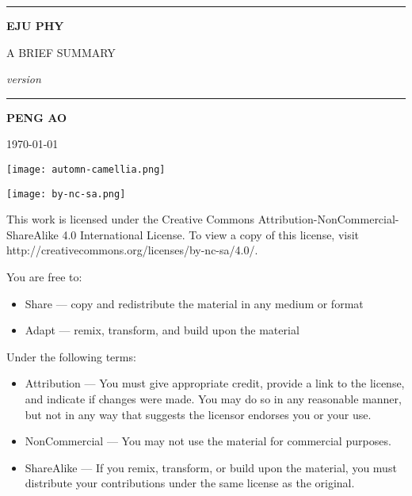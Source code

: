 
\begin{titlepage}
    \begin{center}
        \vspace{4cm}
        
        \rule{\textwidth}{1.2pt}
        
        \vspace{0.3cm}

        {\Huge \textbf{EJU PHY}}

        \vspace{0.3cm}

        {\LARGE A BRIEF SUMMARY}

        \vspace{0.3cm}

        {\Large \textit{version \version}}

        \rule{\textwidth}{1.2pt}

        \vspace{2cm}

        {\LARGE \textbf{PENG AO}}

        \vspace{0.5cm}
        {\Large \today}

        \vfill

        \texttt{[image: automn-camellia.png]}
    \end{center}
\end{titlepage}


\clearpage
\begin{flushleft}
    \null

    \vfill
    \texttt{[image: by-nc-sa.png]}

    This work is licensed under the Creative Commons Attribution-NonCommercial-ShareAlike 4.0 International License. To view a copy of this license, visit http://creativecommons.org/licenses/by-nc-sa/4.0/.

    \vspace{1em}
    You are free to:
    \begin{itemize}
        \item Share — copy and redistribute the material in any medium or format
        \item Adapt — remix, transform, and build upon the material
    \end{itemize}

    Under the following terms:
    \begin{itemize}
        \item Attribution — You must give appropriate credit, provide a link to the license, and indicate if changes were made. You may do so in any reasonable manner, but not in any way that suggests the licensor endorses you or your use.
        \item NonCommercial — You may not use the material for commercial purposes.
        \item ShareAlike — If you remix, transform, or build upon the material, you must distribute your contributions under the same license as the original.
    \end{itemize}
\end{flushleft}

